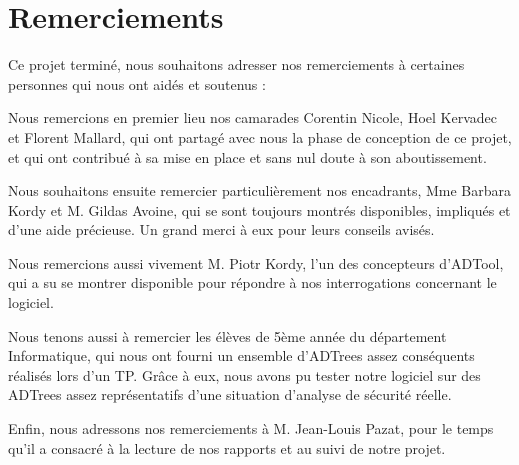 \section{Remerciements}

Ce projet terminé, nous souhaitons adresser nos remerciements à certaines personnes qui nous ont aidés et soutenus :   

Nous remercions en premier lieu nos camarades Corentin {\sc Nicole}, Hoel {\sc Kervadec} et Florent {\sc Mallard}, qui ont partagé avec nous la phase de conception de ce projet, et qui ont contribué à sa mise en place et sans nul doute à son aboutissement.

Nous souhaitons ensuite remercier particulièrement nos encadrants, Mme Barbara {\sc Kordy} et M. Gildas {\sc Avoine}, qui se sont toujours montrés disponibles, impliqués et d'une aide précieuse. Un grand merci à eux pour leurs conseils avisés.

Nous remercions aussi vivement M. Piotr {\sc Kordy}, l'un des concepteurs d'ADTool, qui a su se montrer disponible pour répondre à nos interrogations concernant le logiciel.

Nous tenons aussi à remercier les élèves de 5ème \BK{5\ieme{}} année du département Informatique, qui nous ont fourni un ensemble d'ADTrees assez conséquents réalisés lors d'un TP. Grâce à eux, nous avons pu tester notre logiciel sur des ADTrees assez représentatifs d'une situation d'analyse de sécurité réelle.

Enfin, nous adressons nos remerciements à M. Jean-Louis {\sc Pazat}, pour le temps qu'il a consacré à la lecture de nos rapports et au suivi de notre projet.